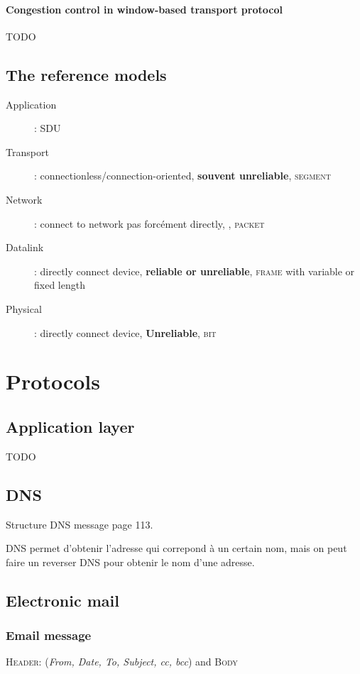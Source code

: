 \documentclass{report}
\begin{document}
\subsubsection{Congestion control in window-based transport protocol}
TODO

\section{The reference models}

\begin{description}
    \item[Application] : \textsc{SDU}
    \item[Transport] : connectionless/connection-oriented, \textbf{souvent unreliable}, \textsc{segment}
    \item[Network] : connect to network pas forcément directly, , \textsc{packet}
    \item[Datalink] : directly connect device, \textbf{reliable or unreliable}, \textsc{frame} with variable or fixed length
    \item[Physical] : directly connect device, \textbf{Unreliable}, \textsc{bit}
\end{description}


\chapter{Protocols}

\section{Application layer}
TODO

\section{DNS}
Structure DNS message page 113.

DNS permet d'obtenir l'adresse qui correpond à un certain nom, mais on peut 
faire un reverser DNS pour obtenir le nom d'une adresse.

\section{Electronic mail}

\subsection{Email message}
\textsc{Header:} (\textit{From, Date, To, Subject,  cc, bcc}) and \textsc{Body} 
\end{document}
